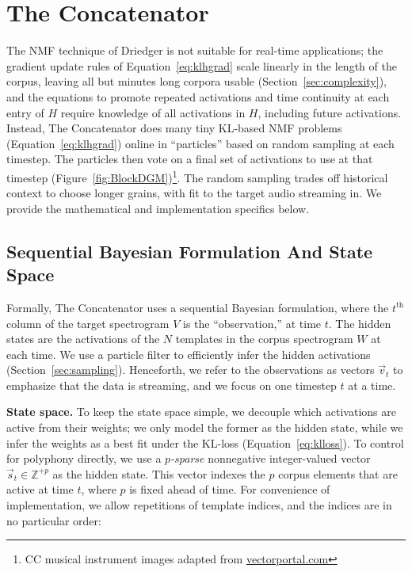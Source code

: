 \documentclass{article}
\begin{document}
\section{The Concatenator}



The NMF technique of Driedger is not suitable for real-time applications; the gradient update rules of Equation~\ref{eq:klhgrad} scale linearly in the length of the corpus, leaving all but minutes long corpora usable (Section~\ref{sec:complexity}), and the equations to promote repeated activations and time continuity at each entry of $H$ require knowledge of all activations in $H$, including future activations.  Instead, The Concatenator does many tiny KL-based NMF problems (Equation~\ref{eq:klhgrad}) online in ``particles'' based on random sampling at each timestep.  The particles then vote on a final set of activations to use at that timestep (Figure~\ref{fig:BlockDGM})\footnote{CC musical instrument images adapted from \url{vectorportal.com}}.  The random sampling trades off historical context to choose longer grains, with fit to the target audio streaming in.  We provide the mathematical and implementation specifics below.

\subsection{Sequential Bayesian Formulation And State Space}
\label{sec:bayesian}

    Formally, The Concatenator uses a sequential Bayesian formulation, where the $t^{\text{th}}$ column of the target spectrogram $V$ is the ``observation,'' at time $t$.  The hidden states are the activations of the $N$ templates in the corpus spectrogram $W$ at each time.  We use a particle filter to efficiently infer the hidden activations (Section~\ref{sec:sampling}). Henceforth, we refer to the observations as vectors $\vec{v}_t$ to emphasize that the data is streaming, and we focus on one timestep $t$ at a time.  
    
    \textbf{State space.} To keep the state space simple, we decouple which activations are active from their weights; we only model the former as the hidden state, while we infer the weights as a best fit under the KL-loss (Equation~\ref{eq:klloss}).  To control for polyphony directly, we use a {\em $p$-sparse} nonnegative integer-valued vector $\vec{s}_t \in \mathbb{Z}^{+p}$ as the hidden state.  This vector indexes the $p$ corpus elements that are active at time $t$, where $p$ is fixed ahead of time.  For convenience of implementation, we allow repetitions of template indices, and the indices are in no particular order:%
\end{document}
